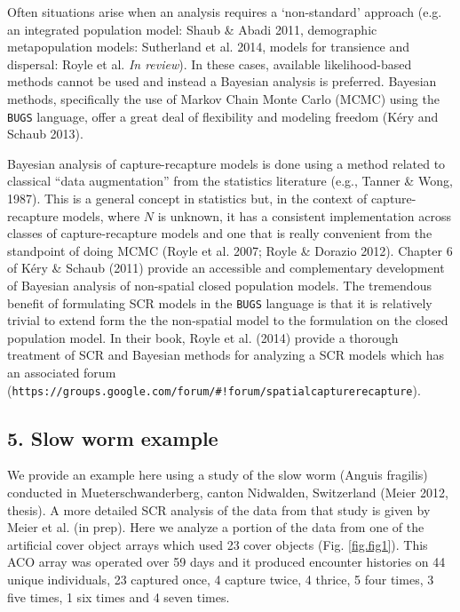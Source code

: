 \documentclass{book}
\begin{document}
Often situations arise when an analysis requires a `non-standard' approach (e.g. an integrated population model: Shaub \& Abadi 2011, demographic metapopulation models: Sutherland et al. 2014, models for transience and dispersal: Royle et al. {\it In review}). In these cases, available likelihood-based methods cannot be used and instead a Bayesian analysis is preferred. Bayesian methods, specifically the use of Markov Chain Monte Carlo (MCMC) using the {\tt BUGS} language, offer a great deal of flexibility and modeling freedom (K\'{e}ry and Schaub 2013).

Bayesian analysis of capture-recapture models is done using a method
related to classical ``data augmentation'' from the statistics
literature (e.g., Tanner \& Wong, 1987).  This is a general concept in
statistics but, in the context of capture-recapture models, where $N$
is unknown, it has a consistent implementation across classes of
capture-recapture models and one that is really convenient from the
standpoint of doing MCMC (Royle et al. 2007; Royle \& Dorazio
2012). Chapter 6 of K\'{e}ry \& Schaub (2011) provide an accessible and
complementary development of Bayesian analysis of non-spatial closed
population models. The tremendous benefit of formulating SCR models in
the {\tt BUGS} language is that it is relatively trivial to extend
form the the non-spatial model to the formulation on the closed
population model. In their book, Royle et al. (2014) provide a
thorough treatment of SCR and Bayesian methods for
analyzing a SCR models which has an associated forum
(\verb|https://groups.google.com/forum/#!forum/spatialcapturerecapture|).

\subsection*{5. Slow worm example}

We provide an example here using a study of the slow worm (Anguis
fragilis) conducted in Mueterschwanderberg, canton Nidwalden,
Switzerland (Meier 2012, thesis). A more detailed SCR analysis of the
data from that study is given by Meier et al. (in prep). Here we
analyze a portion of the data from one of the artificial cover object
arrays which used 23 cover objects (Fig. \ref{fig.fig1}). This ACO
array was operated over 59 days and it produced encounter histories on
44 unique individuals, 23 captured once, 4 capture twice, 4 thrice, 5
four times, 3 five times, 1 six times and 4 seven times.
\end{document}
